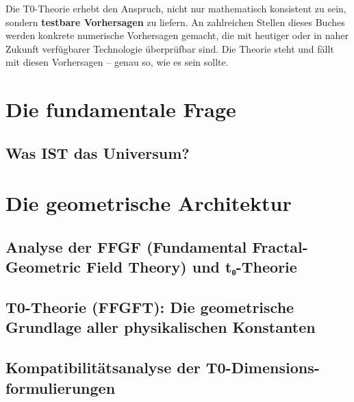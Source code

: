 \documentclass[11pt,oneside]{book}
\begin{document}
\bigskip

Die T0-Theorie erhebt den Anspruch, nicht nur mathematisch konsistent zu sein, sondern \textbf{testbare Vorhersagen} zu liefern. An zahlreichen Stellen dieses Buches werden konkrete numerische Vorhersagen gemacht, die mit heutiger oder in naher Zukunft verfügbarer Technologie überprüfbar sind. Die Theorie steht und fällt mit diesen Vorhersagen -- genau so, wie es sein sollte.

\tableofcontents

\mainmatter
\pagestyle{fancy}

\part{Die fundamentale Frage}

\chapter{Was IST das Universum?}


\part{Die geometrische Architektur}

\chapter{Analyse der FFGF (Fundamental Fractal-Geometric Field Theory) und t₀-Theorie}


\chapter{T0-Theorie (FFGFT): Die geometrische Grundlage aller physikalischen Konstanten}


\chapter{Kompatibilitätsanalyse der T0-Dimensions-formulierungen}

\end{document}
